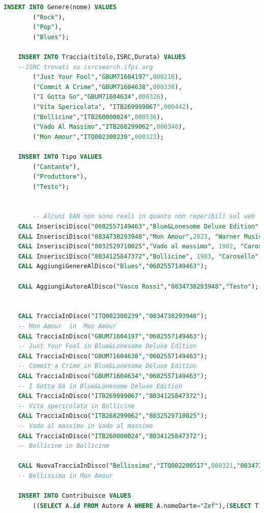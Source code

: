 \documentclass{article}
\begin{document}
\begin{lstlisting}[language=SQL]
    INSERT INTO Genere(nome) VALUES 
        ("Rock"),
        ("Pop"),
        ("Blues");

    INSERT INTO Traccia(titolo,ISRC,Durata) VALUES   
    --ISRC trovati su isrcsearch.ifpi.org
        ("Just Your Fool","GBUM71604197",000216),
        ("Commit A Crime","GBUM71604638",000338),
        ("I Gotta Go","GBUM71604634",000326),
        ("Vita Spericolata", "ITB269999067",000442),
        ("Bollicine","ITB260000024",000536),
        ("Vado Al Massimo","ITB268299062",000340),
        ("Mon Amour","ITQ002300239",000323);

    INSERT INTO Tipo VALUES
        ("Cantante"),
        ("Produttore"),
        ("Testo");
        

        -- Alcuni EAN non sono reali in quanto non reperibili sul web
    CALL InserisciDisco("0602557149463","Blue&Lonesome Deluxe Edition",2016, "Polydor Records", "CD", "The Rolling Stones", "Rock");
    CALL InserisciDisco("0834738293948","Mon Amour",2023, "Warner Music Italy", "Digitale","Annalisa","Pop"); 
    CALL InserisciDisco("8032529710025","Vado al massimo", 1982, "Carosello","CD","Vasco Rossi","Pop");
    CALL InserisciDisco("8034125847372","Bollicine", 1983, "Carosello", "Vinile", "Vasco Rossi","Pop");
    CALL AggiungiGenereAlDisco("Blues","0602557149463");

    CALL AggiungiAutoreAlDisco("Vasco Rossi","0834738293948","Testo");

    
    CALL TracciaInDisco("ITQ002300239","0834738293948"); 
    -- Mon Amour  in  Mon Amour
    CALL TracciaInDisco("GBUM71604197","0602557149463"); 
    -- Just Your Fool in Blue&Lonesome Deluxe Edition
    CALL TracciaInDisco("GBUM71604638","0602557149463"); 
    -- Commit a Crime in Blue&Lonesome Deluxe Edition
    CALL TracciaInDisco("GBUM71604634","0602557149463"); 
    -- I Gotta Go in Blue&Lonesome Deluxe Edition
    CALL TracciaInDisco("ITB269999067","8034125847372"); 
    -- Vita spericolata in Bollicine
    CALL TracciaInDisco("ITB268299062","8032529710025"); 
    -- Vado al massimo in Vado al massimo
    CALL TracciaInDisco("ITB260000024","8034125847372"); 
    -- Bollicine in Bollicine
            
    CALL NuovaTracciaInDisco("Bellissima","ITQ002200517",000321,"0834738293948"); 
    -- Bellissima in Mon Amour
            
    INSERT INTO Contribuisce VALUES
        ((SELECT A.id FROM Autore A WHERE A.nomeDarte="Zef"),(SELECT T.id FROM Traccia T WHERE T.ISRC="ITQ002300239"),"Testo");
        

\end{lstlisting}
\end{document}
